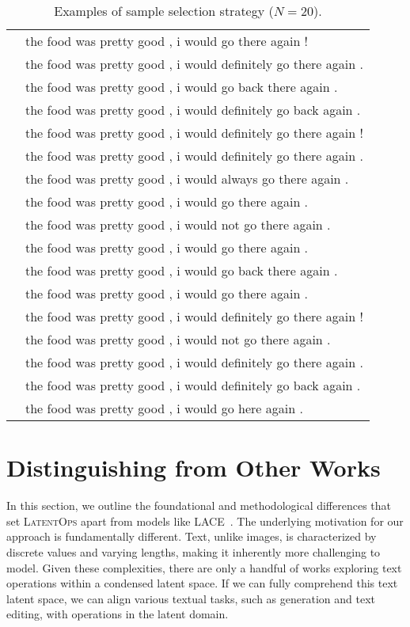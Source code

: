 \documentclass[11pt]{article}
\begin{document}
\begin{table}[ht]
\begin{tabular}{l|l}
&the food was pretty good , i would go there again !\\
&the food was pretty good , i would definitely go there again .\\
&the food was pretty good , i would go back there again .\\
&the food was pretty good , i would definitely go back again .\\
&the food was pretty good , i would definitely go there again !\\
&the food was pretty good , i would definitely go there again .\\
&the food was pretty good , i would always go there again .\\
&the food was pretty good , i would go there again .\\
&the food was pretty good , i would not go there again .\\
&the food was pretty good , i would go there again .\\
&the food was pretty good , i would go back there again .\\
&the food was pretty good , i would go there again .\\
&the food was pretty good , i would definitely go there again !\\
&the food was pretty good , i would not go there again .\\
&the food was pretty good , i would definitely go there again .\\
&the food was pretty good , i would definitely go back again .\\
&the food was pretty good , i would go here again .\\
\bottomrule
    \end{tabular}
    \vspace{-7pt}
    \caption{Examples of sample selection strategy ($N=20$). 
}
    \label{tab:exmaple_sample_selection}
\end{table}
\clearpage
\section{Distinguishing from Other Works}
\label{app:lace}
In this section, we outline the foundational and methodological differences that set \textsc{LatentOps} apart from models like LACE~\citep{nie2021controllable}.
The underlying motivation for our approach is fundamentally different. Text, unlike images, is characterized by discrete values and varying lengths, making it inherently more challenging to model. Given these complexities, there are only a handful of works exploring text operations within a condensed latent space. If we can fully comprehend this text latent space, we can align various textual tasks, such as generation and text editing, with operations in the latent domain.
\end{document}
